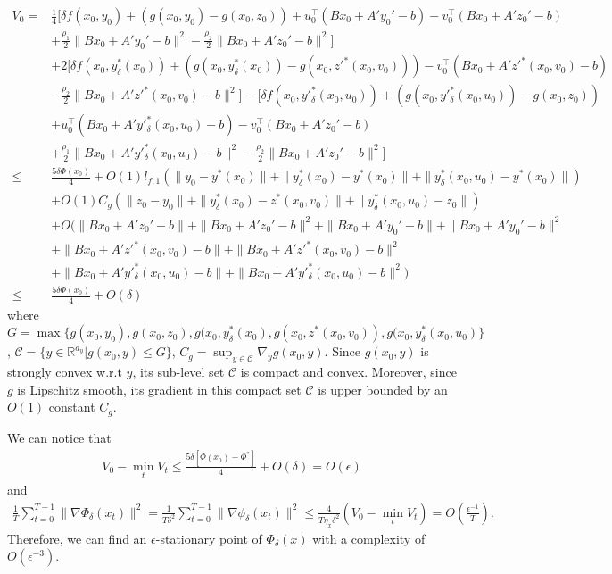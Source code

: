 \documentclass{article}
\newcommand{\Cc}{\mathcal{C}}
\def\R{\mathbb{R}}
\newcommand{\pth}[1]{\left( #1 \right)}
\theoremstyle{plain}
\theoremstyle{definition}
\theoremstyle{remark}
\begin{document}
    \begin{align*}
        V_0=&\frac{1}{4}[\delta f(x_0, y_0)+ (g(x_0, y_0)-g(x_0, z_0))+u_0^\top(Bx_0+A'y_0'-b) -v_0^\top(Bx_0+A'z_0'-b)\\
        &+\frac{\rho_1}{2}\|Bx_0+A'y_0'-b\|^2-\frac{\rho_2}{2}\|Bx_0+A'z_0'-b\|^2]\\
        &+2[\delta f(x_0, y^*_\delta(x_0))+ (g(x_0, y^*_\delta(x_0))-g(x_0, z'^*(x_0,v_0))) -v_0^\top(Bx_0+A'z'^*(x_0,v_0)-b)\\
        &-\frac{\rho_2}{2}\|Bx_0+A'z'^*(x_0,v_0)-b\|^2]-[\delta f(x_0, y'^*_\delta(x_0,u_0))+ (g(x_0, y'^*_\delta(x_0,u_0))-g(x_0, z_0))\\
        &+u_0^\top(Bx_0+A'y'^*_\delta(x_0,u_0)-b) -v_0^\top(Bx_0+A'z_0'-b)\\
        &+\frac{\rho_1}{2}\|Bx_0+A'y'^*_\delta(x_0,u_0)-b\|^2-\frac{\rho_2}{2}\|Bx_0+A'z_0'-b\|^2]\\
        \leq& \frac{5\delta \Phi(x_0)}{4}+O(1)l_{f,1}(\|y_0-y^*(x_0)\|+\|y^*_\delta(x_0)-y^*(x_0)\|+\|y^*_\delta(x_0,u_0)-y^*(x_0)\|)\\
        &+O(1)C_g(\|z_0-y_0\|+\|y^*_\delta(x_0)-z^*(x_0,v_0)\|+\|y^*_\delta(x_0,u_0)-z_0\|)\\
        &+O(\|Bx_0+A'z_0'-b\|+\|Bx_0+A'z_0'-b\|^2+\|Bx_0+A'y_0'-b\|+\|Bx_0+A'y_0'-b\|^2\\
        &+\|Bx_0+A'z'^*(x_0,v_0)-b\|+\|Bx_0+A'z'^*(x_0,v_0)-b\|^2\\
        &+\|Bx_0+A'y'^*_\delta(x_0,u_0)-b\|+\|Bx_0+A'y'^*_\delta(x_0,u_0)-b\|^2)\\
        \leq&\frac{5\delta \Phi(x_0)}{4}+O(\delta)
    \end{align*}
where $G=\max\{g(x_0, y_0), g(x_0, z_0), g(x_0, y^*_\delta(x_0),g(x_0, z^*(x_0,v_0)), g(x_0, y^*_\delta(x_0,u_0)\}$, $\Cc=\{y\in \R^{d_y}| g(x_0, y)\leq G\}$,
$C_g=\sup_{y\in \Cc}\nabla_y g(x_0,y)$. Since $g(x_0, y)$ is strongly convex w.r.t $y$, its sub-level set $\Cc$ is compact and convex. Moreover, since $g$ is Lipschitz
smooth, its gradient in this compact set $\Cc$ is upper bounded by an $O(1)$ constant $C_g$.

We can notice that
\begin{align*}
V_0-\min_tV_t\leq   \frac{5\delta [\Phi(x_0)-\Phi^*]}{4}+O(\delta)=O(\epsilon)
\end{align*}
and
\begin{align*}
    \frac{1}{T}\sum_{t=0}^{T-1}\|\nabla \Phi_\delta(x_{t})\|^2= \frac{1}{T\delta^2}\sum_{t=0}^{T-1}\|\nabla \phi_\delta(x_{t})\|^2 \leq \frac{4}{T\eta_x\delta^2}(V_0-\min_tV_t )=O\pth{\frac{\epsilon^{-1}}{T}}.
\end{align*}
Therefore, we can find an $\epsilon$-stationary point of $\Phi_\delta(x)$ with a complexity of $O(\epsilon^{-3})$.
\end{document}
